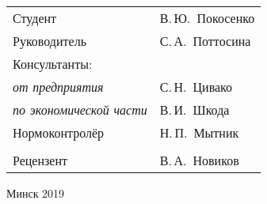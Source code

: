 \begin{titlepage}
\begin{center}
    \begin{tabular}{ p{}p{} }
      Студент & В.\,Ю.~Покосенко \\
      Руководитель & С.\,А.~Поттосина \\
      Консультанты: &\\
      \hspace*{3ex}\emph{от предприятия} & С.\,Н.~Цивако \\
      \hspace*{3ex}\emph{по экономической части} & В.\,И.~Шкода \\
      Нормоконтролёр & Н.\,П.~Мытник\\
      & \\
      Рецензент & В.\,А.~Новиков 
    \end{tabular}
    
    \vfill
    {\normalsize Минск 2019}
  \end{center}
\end{titlepage}
